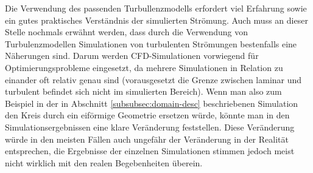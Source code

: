 \begin{refsection}
Die Verwendung des passenden Turbullenzmodells erfordert viel Erfahrung sowie ein gutes 
praktisches Verständnis der simulierten Strömung. Auch muss an dieser Stelle nochmals erwähnt werden,
dass durch die Verwendung von Turbulenzmodellen Simulationen von turbulenten Strömungen bestenfalls eine Näherungen sind.
Darum werden CFD-Simulationen vorwiegend für Optimierungsprobleme eingesetzt, da mehrere Simulationen in Relation zu einander
oft relativ genau sind (vorausgesetzt die Grenze zwischen laminar und turbulent befindet sich nicht im simulierten Bereich).
Wenn man also zum Beispiel in der in Abschnitt \ref{subsubsec:domain-desc} beschriebenen Simulation den Kreis durch ein
eiförmige Geometrie ersetzen würde, könnte man in den Simulationsergebnissen eine klare Veränderung feststellen.
Diese Veränderung würde in den meisten Fällen auch ungefähr der Veränderung in der Realität entsprechen,
die Ergebnisse der einzelnen Simulationen stimmen jedoch meist nicht wirklich mit den realen Begebenheiten überein.


% 
% 
% 

\printbibliography[heading=subbibliography]
\end{refsection}
